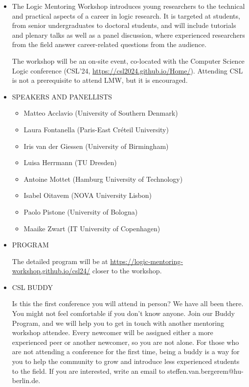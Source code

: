 \documentclass[prodmode,acmtecs]{acmsmall} %
\begin{document}
\begin{itemize}\item  The Logic Mentoring Workshop introduces young researchers to the technical and practical aspects of a career in logic research. It is targeted at students, from senior undergraduates to doctoral students, and will include tutorials and plenary talks as well as a panel discussion, where experienced researchers from the field answer career-related questions from the audience. 
 
  The workshop will be an on-site event, co-located with the Computer Science Logic conference (CSL’24, \href{https://csl2024.github.io/Home/}{https://csl2024.github.io/Home/}). Attending CSL is not a prerequisite to attend LMW, but it is encouraged.  
 
\item  SPEAKERS AND PANELLISTS 
 
\begin{itemize}\item  Matteo Acclavio (University of Southern Denmark)
\item  Laura Fontanella (Paris-East Créteil University)
\item  Iris van der Giessen (University of Birmingham)
\item  Luisa Herrmann (TU Dresden)
\item  Antoine Mottet (Hamburg University of Technology)
\item  Isabel Oitavem (NOVA University Lisbon)
\item  Paolo Pistone (University of Bologna)
\item  Maaike Zwart (IT University of Copenhagen)
\end{itemize} 
\item  PROGRAM 
 
  The detailed program will be at \href{https://logic-mentoring-workshop.github.io/csl24/}{https://logic-mentoring-workshop.github.io/csl24/} closer to the workshop. 
 
\item  CSL BUDDY 
 
  Is this the first conference you will attend in person? We have all been there. You might not feel comfortable if you don't know anyone. Join our Buddy Program, and we will help you to get in touch with another mentoring workshop attendee. Every newcomer will be assigned either a more experienced peer or another newcomer, so you are not alone. For those who are not attending a conference for the first time, being a buddy is a way for you to help the community to grow and introduce less experienced students to the field. If you are interested, write an email to steffen.van.bergerem@hu-berlin.de. 
 

\end{itemize}
\end{document}
